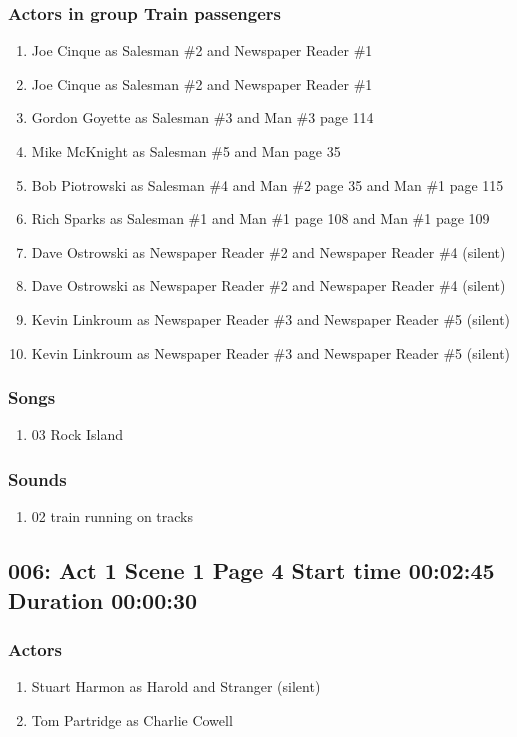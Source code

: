 \subsubsection{Actors in group Train passengers}
\begin{enumerate}
\item Joe Cinque as Salesman \#2 and Newspaper Reader \#1
\item Joe Cinque as Salesman \#2 and Newspaper Reader \#1
\item Gordon Goyette as Salesman \#3 and Man \#3 page 114
\item Mike McKnight as Salesman \#5 and Man page 35
\item Bob Piotrowski as Salesman \#4 and Man \#2 page 35 and Man \#1 page 115
\item Rich Sparks as Salesman \#1 and Man \#1 page 108 and Man \#1 page 109
\item Dave Ostrowski as Newspaper Reader \#2 and Newspaper Reader \#4 (silent)
\item Dave Ostrowski as Newspaper Reader \#2 and Newspaper Reader \#4 (silent)
\item Kevin Linkroum as Newspaper Reader \#3 and Newspaper Reader \#5 (silent)
\item Kevin Linkroum as Newspaper Reader \#3 and Newspaper Reader \#5 (silent)
\end{enumerate}

\subsubsection{Songs}
\begin{enumerate}
\item 03 Rock Island
\end{enumerate}\subsubsection{Sounds}
\begin{enumerate}
\item 02 train running on tracks
\end{enumerate}
\subsection{006: Act 1 Scene 1 Page 4 Start time 00:02:45 Duration 00:00:30}

\subsubsection{Actors}
\begin{enumerate}
\item Stuart Harmon as Harold and Stranger (silent)
\item Tom Partridge as Charlie Cowell
\end{enumerate}
